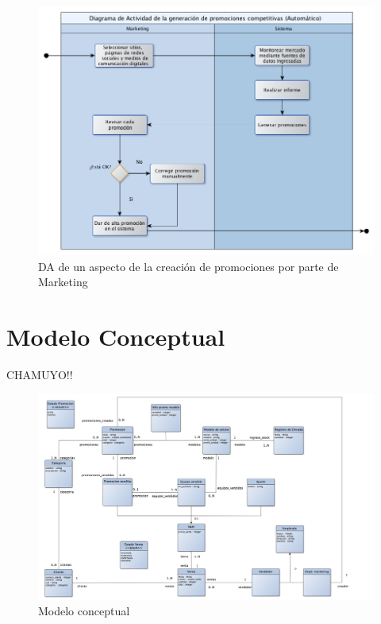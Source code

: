 \begin{figure}[h!]
  \centering
  \includegraphics[width=1\textwidth]{./imagenes/da_marketing.png}
  \caption{DA de un aspecto de la creación de promociones por parte de Marketing}
  \label{fig:da_marketing}
\end{figure}

\clearpage

\section{Modelo Conceptual}

CHAMUYO!!

\begin{figure}[h!]
  \centering
  \includegraphics[width=1.5\textwidth, angle=90]{./imagenes/modelo_conceptual.png}
  \caption{Modelo conceptual}
  \label{fig:modelo_conceptual}
\end{figure}


